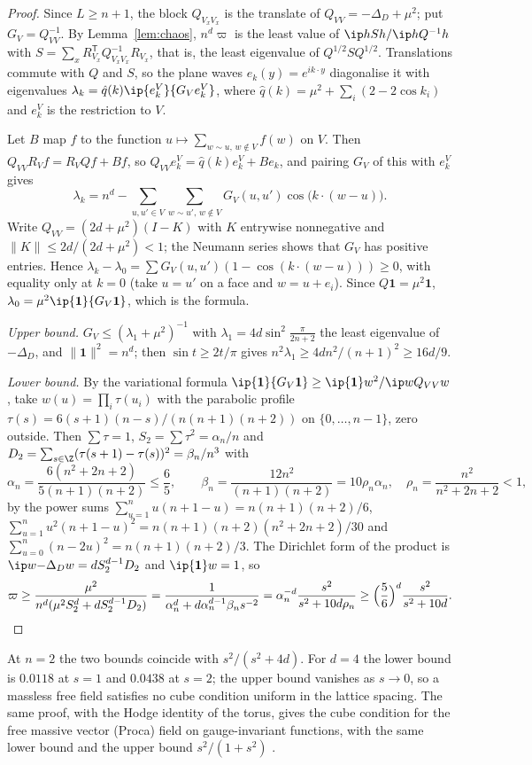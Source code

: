 \begin{proof}
Since $L\ge n+1$, the block $Q_{V_xV_x}$ is the translate of $Q_{VV}=-\Delta_D+
\mu^2$; put $G_V=Q_{VV}^{-1}$. By Lemma~\ref{lem:chaos}, $n^d\varpi$ is the least
value of $\ip h{Sh}/\ip h{Q^{-1}h}$ with $S=\sum_xR_{V_x}^{\mathsf T}Q_{V_xV_x}^{-1}
R_{V_x}$, that is, the least eigenvalue of $Q^{1/2}SQ^{1/2}$. Translations commute
with $Q$ and $S$, so the plane waves $e_k(y)=e^{ik\cdot y}$ diagonalise it with
eigenvalues $\lambda_k=\hat q(k)\ip{e_k^V}{G_Ve_k^V}$, where $\hat q(k)=\mu^2+
\sum_i(2-2\cos k_i)$ and $e_k^V$ is the restriction to $V$.

Let $B$ map $f$ to the function $u\mapsto\sum_{w\sim u,\,w\notin V}f(w)$ on $V$.
Then $Q_{VV}R_Vf=R_VQf+Bf$, so $Q_{VV}e_k^V=\hat q(k)e_k^V+Be_k$, and pairing
$G_V$ of this with $e_k^V$ gives
\[
\lambda_k=n^d-\sum_{u,u'\in V}\sum_{w\sim u',\,w\notin V}G_V(u,u')\cos\bigl(k\cdot
(w-u)\bigr).
\]
Write $Q_{VV}=(2d+\mu^2)(I-K)$ with $K$ entrywise nonnegative and $\|K\|\le
2d/(2d+\mu^2)<1$; the Neumann series shows that $G_V$ has positive entries.
Hence $\lambda_k-\lambda_0=\sum G_V(u,u')(1-\cos(k\cdot(w-u)))\ge0$, with equality only
at $k=0$ (take $u=u'$ on a face and $w=u+e_i$). Since $Q\mathbf 1=\mu^2\mathbf 1$,
$\lambda_0=\mu^2\ip{\mathbf 1}{G_V\mathbf 1}$, which is the formula.

\emph{Upper bound.} $G_V\le(\lambda_1+\mu^2)^{-1}$ with $\lambda_1=4d\sin^2\frac\pi
{2n+2}$ the least eigenvalue of $-\Delta_D$, and $\|\mathbf 1\|^2=n^d$; then
$\sin t\ge2t/\pi$ gives $n^2\lambda_1\ge4dn^2/(n+1)^2\ge16d/9$.

\emph{Lower bound.} By the variational formula $\ip{\mathbf 1}{G_V\mathbf 1}\ge
\ip{\mathbf 1}w^2/\ip w{Q_{VV}w}$, take $w(u)=\prod_i\tau(u_i)$ with the parabolic
profile $\tau(s)=6(s+1)(n-s)/(n(n+1)(n+2))$ on $\{0,\dots,n-1\}$, zero
outside. Then $\sum\tau=1$, $S_2=\sum\tau^2=\alpha_n/n$ and $D_2=\sum_{s\in\Z}
(\tau(s+1)-\tau(s))^2=\beta_n/n^3$ with
\[
\alpha_n=\frac{6(n^2+2n+2)}{5(n+1)(n+2)}\le\frac65,\qquad
\beta_n=\frac{12n^2}{(n+1)(n+2)}=10\rho_n\alpha_n,\quad
\rho_n=\frac{n^2}{n^2+2n+2}<1,
\]
by the power sums $\sum_{u=1}^nu(n+1-u)=n(n+1)(n+2)/6$, $\sum_{u=1}^nu^2(n+1-u)^2=
n(n+1)(n+2)(n^2+2n+2)/30$ and $\sum_{u=0}^n(n-2u)^2=n(n+1)(n+2)/3$. The Dirichlet
form of the product is $\ip w{-\Delta_Dw}=dS_2^{d-1}D_2$ and $\ip{\mathbf 1}w=1$, so
\[
\varpi\ge\frac{\mu^2}{n^d(\mu^2S_2^d+dS_2^{d-1}D_2)}=\frac1{\alpha_n^d+d\alpha_n^{d-1}
\beta_ns^{-2}}=\alpha_n^{-d}\frac{s^2}{s^2+10d\rho_n}\ge\Bigl(\frac56\Bigr)^d
\frac{s^2}{s^2+10d}.\qedhere
\]
\end{proof}

At $n=2$ the two bounds coincide with $s^2/(s^2+4d)$. For $d=4$ the lower
bound is $0.0118$ at $s=1$ and $0.0438$ at $s=2$; the upper bound vanishes as
$s\to0$, so a massless free field satisfies no cube condition uniform in the
lattice spacing. The same proof, with the Hodge identity of the torus, gives
the cube condition for the free massive vector (Proca) field on gauge-invariant
functions, with the same lower bound and the upper bound $s^2/(1+s^2)$
\cite{BBLRS26}.
